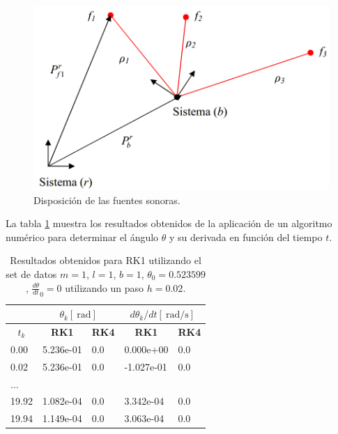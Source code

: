 \begin{figure}[h]
	\centering
	\includegraphics[scale=0.35]{includes/4_sound_sources_diagram.png}
	\caption{Disposición de las fuentes sonoras.} \label{4_sound_sources_diagram}
\end{figure}


La tabla \ref{tabla_ej2} muestra los resultados obtenidos de la aplicación de un algoritmo numérico para determinar el ángulo $\theta$ y su derivada en función del tiempo $t$.

\begin{table}[h!]
	\centering
	\begin{tabular}{|l|l|l|l|l|}
		\hline
		\multicolumn{1}{|c|}{} & \multicolumn{2}{c|}{\textbf{$\theta_k[\SI{}{\radian}]$}} & \multicolumn{2}{c|}{\textbf{$d\theta_k/dt[\SI{}{\radian\per\second}]$}} \\ \hline
		\multicolumn{1}{|c|}{\textbf{$t_k$}} & \multicolumn{1}{c|}{\textbf{RK1}} & \multicolumn{1}{c|}{\textbf{RK4}} & \multicolumn{1}{c|}{\textbf{RK1}} & \multicolumn{1}{c|}{\textbf{RK4}} \\ \hline
		0.00 & 5.236e-01 & 0.0 & 0.000e+00 &  0.0 \\ \hline
		0.02 & 5.236e-01 & 0.0 & -1.027e-01 & 0.0  \\ \hline
		... &  &  &  &  \\ \hline
		19.92 & 1.082e-04 & 0.0 & 3.342e-04 & 0.0 \\ \hline
		19.94 & 1.149e-04 & 0.0 & 3.063e-04 & 0.0 \\ \hline
	\end{tabular}
	\caption{Resultados obtenidos para RK1 utilizando el set de datos $m=1$, $l=1$, $b=1$, $\theta_0=0.523599$, $\frac{d\theta}{dt}_0=0$ utilizando un paso $h = 0.02$.}
	\label{tabla_ej2}
\end{table}

